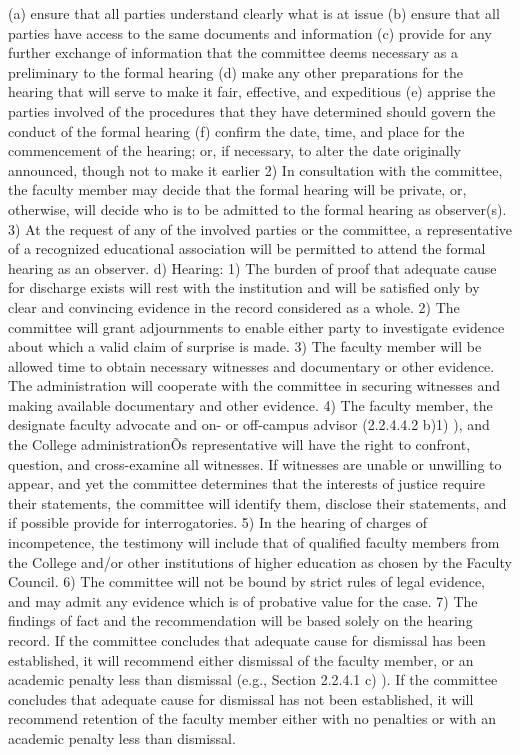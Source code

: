 \documentclass[letterpaper, 11pt]{article}
\begin{document}
(a) ensure that all parties understand clearly what is at issue
(b) ensure that all parties have access to the same documents and information
(c) provide for any further exchange of information that the committee deems necessary as a preliminary to the formal hearing
(d) make any other preparations for the hearing that will serve to make it fair, effective, and expeditious
(e) apprise the parties involved of the procedures that they have determined should govern the conduct of the formal hearing
(f) confirm the date, time, and place for the commencement of the hearing; or, if necessary, to alter the date originally announced, though not to make it earlier
2) In consultation with the committee, the faculty member may decide that the formal hearing will be private, or, otherwise, will decide who is to be admitted to the formal hearing as observer(s).
3) At the request of any of the involved parties or the committee, a representative of a recognized educational association will be permitted to attend the formal hearing as an observer.
d) Hearing:
1) The burden of proof that adequate cause for discharge exists will rest with the institution and will be satisfied only by clear and convincing evidence in the record considered as a whole.
2) The committee will grant adjournments to enable either party to investigate evidence about which a valid claim of surprise is made.
3) The faculty member will be allowed time to obtain necessary witnesses and documentary or other evidence.  The administration will cooperate with the committee in securing witnesses and making available documentary and other evidence.
4) The faculty member, the designate faculty advocate and on- or off-campus advisor (2.2.4.4.2  b)1) ), and the College administrationÕs representative will have the right to confront, question, and cross-examine all witnesses.  If witnesses are unable or unwilling to appear, and yet the committee determines that the interests of justice require their statements, the committee will identify them, disclose their statements, and if possible provide for interrogatories.
5) In the hearing of charges of incompetence, the testimony will include that of qualified faculty members from the College and/or other institutions of higher education as chosen by the Faculty Council.
6) The committee will not be bound by strict rules of legal evidence, and may admit any evidence which is of probative value for the case.
7) The findings of fact and the recommendation will be based solely on the hearing record.
If the committee concludes that adequate cause for dismissal has been established, it will recommend either dismissal of the faculty member, or an academic penalty less than dismissal (e.g., Section 2.2.4.1 c) ).  If the committee concludes that adequate cause for dismissal has not been established, it will recommend retention of the faculty member either with no penalties or with an academic penalty less than dismissal.
\end{document}
